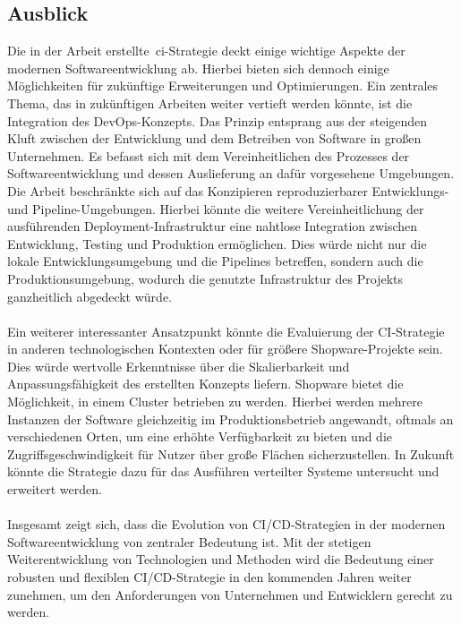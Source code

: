 \subsection{Ausblick} \label{subsec:06-prospect-2}

Die in der Arbeit erstellte\ \acrshort{ci}-Strategie deckt einige wichtige Aspekte der modernen Softwareentwicklung
ab.
Hierbei bieten sich dennoch einige Möglichkeiten für zukünftige Erweiterungen und Optimierungen.
Ein zentrales Thema, das in zukünftigen Arbeiten weiter vertieft werden könnte, ist die Integration des
\glqq DevOps\grqq-Konzepts.
Das Prinzip entsprang aus der steigenden Kluft zwischen der Entwicklung und dem Betreiben von Software in großen
Unternehmen.
Es befasst sich mit dem Vereinheitlichen des Prozesses der Softwareentwicklung und dessen Auslieferung an
dafür vorgesehene Umgebungen.
Die Arbeit beschränkte sich auf das Konzipieren reproduzierbarer Entwicklungs- und Pipeline-Umgebungen.
Hierbei könnte die weitere Vereinheitlichung der ausführenden Deployment-Infrastruktur eine nahtlose Integration
zwischen Entwicklung, Testing und Produktion ermöglichen.
Dies würde nicht nur die lokale Entwicklungsumgebung und die Pipelines betreffen, sondern auch die
Produktionsumgebung, wodurch die genutzte Infrastruktur des Projekts ganzheitlich abgedeckt würde.
\\\\
Ein weiterer interessanter Ansatzpunkt könnte die Evaluierung der CI-Strategie in anderen technologischen Kontexten
oder für größere Shopware-Projekte sein.
Dies würde wertvolle Erkenntnisse über die Skalierbarkeit und Anpassungsfähigkeit des erstellten Konzepts liefern.
Shopware bietet die Möglichkeit, in einem Cluster betrieben zu werden.
Hierbei werden mehrere Instanzen der Software gleichzeitig im Produktionsbetrieb angewandt, oftmals an
verschiedenen Orten, um eine erhöhte Verfügbarkeit zu bieten und die Zugriffsgeschwindigkeit für Nutzer über große
Flächen sicherzustellen.
In Zukunft könnte die Strategie dazu für das Ausführen verteilter Systeme untersucht und erweitert werden.
\\\\
Insgesamt zeigt sich, dass die Evolution von CI/CD-Strategien in der modernen Softwareentwicklung von zentraler
Bedeutung ist.
Mit der stetigen Weiterentwicklung von Technologien und Methoden wird die Bedeutung einer robusten und flexiblen
CI/CD-Strategie in den kommenden Jahren weiter zunehmen, um den Anforderungen von Unternehmen und Entwicklern gerecht
zu werden.

\clearpage

